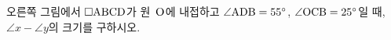 \noindent\begin{minipage}[t]{0.58\linewidth}\vspace{0pt}\raggedright 오른쪽 그림에서 $\square\mathrm{ABCD}$가 원~$\mathrm{O}$에 내접하고 $\angle\mathrm{ADB}=55^\circ$, $\angle\mathrm{OCB}=25^\circ$일 때, $\angle x-\angle y$의 크기를 구하시오.\end{minipage}\hfill\begin{minipage}[t]{0.4\linewidth}\vspace{0pt}\centering \resizebox{\ifdim\width>\linewidth\linewidth\else\width\fi}{!}{}\end{minipage}\par
